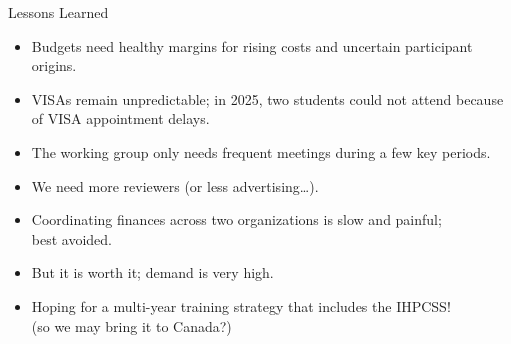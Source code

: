 \documentclass[
  11pt,
  ignorenonframetext,
  aspectratio=169,handout]{beamer}
\begin{document}
\begin{frame}{Lessons Learned}
\label{lessons-learned}
\pause

\begin{itemize}
\item
  Budgets need healthy margins for rising costs and uncertain participant origins.

  \pause
\item
  VISAs remain unpredictable; in 2025, two students could not attend because of VISA appointment delays.

  \pause
\item
  The working group only needs frequent meetings during a few key periods.

  \pause
\item
  We need more reviewers (or less advertising\ldots).

  \pause
\item
  Coordinating finances across two organizations is slow and painful;\\
  best avoided.
\end{itemize}

\pause

\begin{block}{}\setlength{\parskip}{0.5\baselineskip}
\label{section}
\begin{itemize}
\item
  But it is worth it; demand is very high.

  \pause
\item
  Hoping for a multi-year training strategy that includes the IHPCSS!\\
  (so we may bring it to Canada?)
\end{itemize}
\end{block}
\end{frame}
\end{document}
